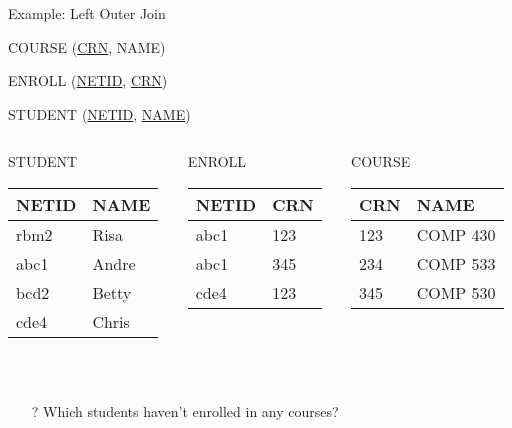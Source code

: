 \documentclass[aspectratio=169]{beamer}
\begin{document}
\begin{frame}{Example: Left Outer Join}

COURSE (\underline{CRN}, NAME)

ENROLL (\underline{NETID}, \underline{CRN})

STUDENT (\underline{NETID}, \underline{NAME})

\begin{columns}[T]
\begin{column}{0.3\textwidth}
STUDENT\\
\begin{tabular}{|l|l|} \hline
\textbf{NETID} & \textbf{NAME} \\ \hline
rbm2 & Risa \\\hline
abc1 & Andre \\\hline
bcd2 & Betty \\ \hline
cde4 & Chris \\ \hline
\end{tabular}\\
\end{column}
\begin{column}{0.3\textwidth}
ENROLL\\
\begin{tabular}{|l|l|} \hline
\textbf{NETID} & \textbf{CRN} \\ \hline
abc1 & 123 \\\hline
abc1 & 345\\\hline
cde4 & 123 \\ \hline
\end{tabular}
\end{column}
\begin{column}{0.3\textwidth}
COURSE\\
\begin{tabular}{|l|l|} \hline
\textbf{CRN} & \textbf{NAME} \\ \hline
123 & COMP 430 \\\hline
234 & COMP 533 \\\hline
345 & COMP 530 \\ \hline
\end{tabular}\\
\end{column}
\end{columns}


\begin{itemize}
\item[?] Which students haven't enrolled in any courses?
\end{itemize}

\end{frame}
\end{document}
